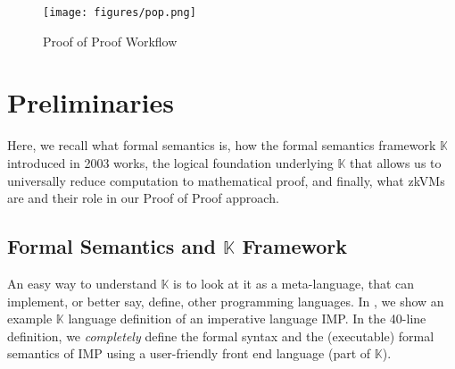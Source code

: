 \documentclass{article}
\theoremstyle{plain}
\theoremstyle{definition}
\newcommand{\K}{$\mathbb{K}$\xspace}
\begin{document}
\begin{figure}
\texttt{[image: figures/pop.png]}
\caption{Proof of Proof Workflow}
\label{fig:workflow}
\end{figure}



\section{Preliminaries} \label{sec:prelim}

Here, we recall what formal semantics is, how the formal semantics framework \K introduced in 2003 works, the logical foundation underlying \K that allows us to universally reduce computation to mathematical proof, and finally, what zkVMs are and their role in our Proof of Proof approach.

\subsection{Formal Semantics and \texorpdfstring{\K}{\K} Framework}

An easy way to understand \K is to look at it as a meta-language, that can implement, or better say, define, other programming languages. 
In , we show an example \K language definition
of an imperative language IMP. 
In the 40-line definition, 
we \emph{completely} define the formal syntax and
the (executable) formal semantics of IMP using a user-friendly front end language (part of \K).
\end{document}

